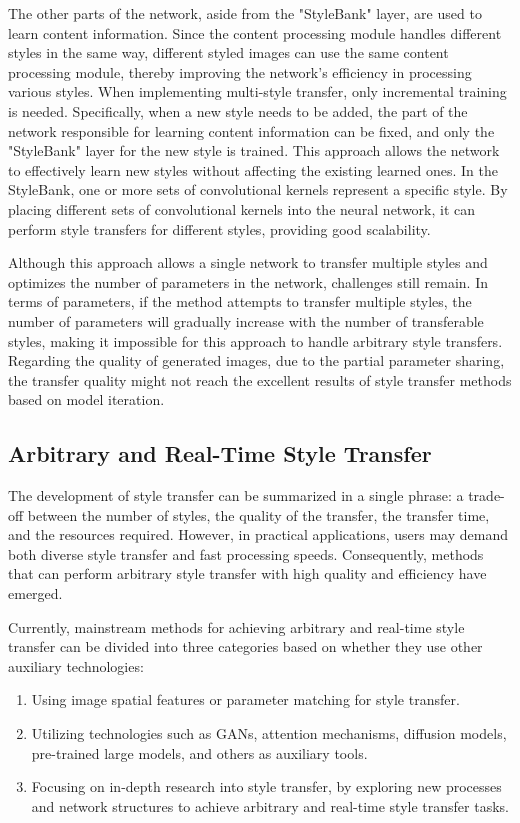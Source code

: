 \documentclass[preprint,12pt]{elsarticle}
\begin{document}
The other parts of the network, aside from the "StyleBank" layer, are used to learn content information. Since the content processing module handles different styles in the same way, different styled images can use the same content processing module, thereby improving the network's efficiency in processing various styles. When implementing multi-style transfer, only incremental training is needed. Specifically, when a new style needs to be added, the part of the network responsible for learning content information can be fixed, and only the "StyleBank" layer for the new style is trained. This approach allows the network to effectively learn new styles without affecting the existing learned ones. In the StyleBank, one or more sets of convolutional kernels represent a specific style. By placing different sets of convolutional kernels into the neural network, it can perform style transfers for different styles, providing good scalability.

Although this approach allows a single network to transfer multiple styles and optimizes the number of parameters in the network, challenges still remain. In terms of parameters, if the method attempts to transfer multiple styles, the number of parameters will gradually increase with the number of transferable styles, making it impossible for this approach to handle arbitrary style transfers. Regarding the quality of generated images, due to the partial parameter sharing, the transfer quality might not reach the excellent results of style transfer methods based on model iteration.

\subsection{Arbitrary and Real-Time Style Transfer}

The development of style transfer can be summarized in a single phrase: a trade-off between the number of styles, the quality of the transfer, the transfer time, and the resources required. However, in practical applications, users may demand both diverse style transfer and fast processing speeds. Consequently, methods that can perform arbitrary style transfer with high quality and efficiency have emerged.

Currently, mainstream methods for achieving arbitrary and real-time style transfer can be divided into three categories based on whether they use other auxiliary technologies:
\begin{enumerate}
    \item Using image spatial features or parameter matching for style transfer.
    \item Utilizing technologies such as GANs\citep{38goodfellow2014generative}, attention mechanisms, diffusion models, pre-trained large models, and others as auxiliary tools.
    \item Focusing on in-depth research into style transfer, by exploring new processes and network structures to achieve arbitrary and real-time style transfer tasks.
\end{enumerate}
\end{document}
